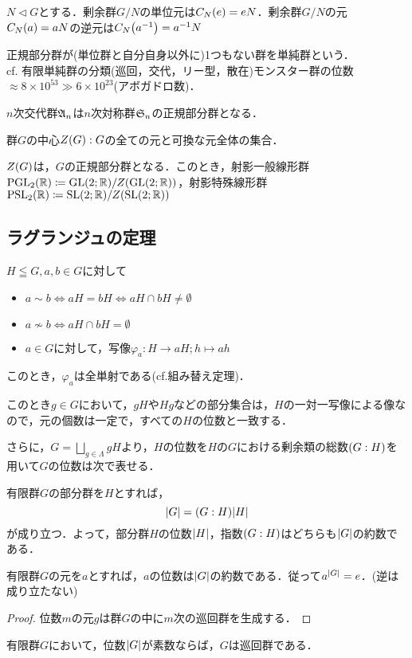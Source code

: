 \documentclass[main]{subfiles}
\begin{document}
	\begin{remark*}
		$N\triangleleft G$とする．剰余群$G/N$の単位元は$C_N\qty(e)=eN$．剰余群$G/N$の元$C_N\qty(a)=aN$の逆元は$C_N\qty(a^{-1})=a^{-1}N$
	\end{remark*}
	\begin{dfn}[単純群]
		正規部分群が(単位群と自分自身以外に)1つもない群を単純群という．\\
		cf. 有限単純群の分類(巡回，交代，リー型，散在)モンスター群の位数$\approx 8\times 10^{53}\gg 6\times 10^{23}$(アボガドロ数)．
	\end{dfn}
	\begin{ex}
		$n$次交代群$\mathfrak{A}_n$は$n$次対称群$\mathfrak{S}_n$の正規部分群となる．
	\end{ex}
	\begin{dfn}
		群$G$の中心$Z\qty(G):G$の全ての元と可換な元全体の集合．
	\end{dfn}
	\begin{remark*}
		$Z\qty(G)$は，$G$の正規部分群となる．このとき，射影一般線形群$\text{PGL}_2\qty(\mathbb{R})\coloneqq \text{GL}\qty(2;\mathbb{R})/Z\qty(\text{GL}\qty(2;\mathbb{R}))$，射影特殊線形群$\text{PSL}_2\qty(\mathbb{R})\coloneqq \text{SL}\qty(2;\mathbb{R})/Z\qty(\text{SL}\qty(2;\mathbb{R}))$
	\end{remark*}
	\subsection{ラグランジュの定理}
		\begin{prop}[左剰余類に関する定理]
			$H\leqq G,a,b\in G$に対して
			\begin{itemize}
				\item $a\sim b\Leftrightarrow aH=bH\Leftrightarrow aH\cap bH\neq\emptyset$
				\item $a\not\sim b\Leftrightarrow aH\cap bH=\emptyset$
				\item $a\in G$に対して，写像$\varphi_a:H\to aH;h\mapsto ah$
			\end{itemize}
			このとき，$\varphi_a$は全単射である(cf.組み替え定理)．
		\end{prop}
		このとき$g\in G$において，$gH$や$Hg$などの部分集合は，$H$の一対一写像による像なので，元の個数は一定で，すべての$H$の位数と一致する．

		さらに，$G=\bigsqcup_{g\in\Lambda}gH$より，$H$の位数を$H$の$G$における剰余類の総数$\qty(G:H)$を用いて$G$の位数は次で表せる．
		\begin{thm}[ラグランジュの定理]
			有限群$G$の部分群を$H$とすれば，
			\[\qty|G|=\qty(G:H)\qty|H|\]
			が成り立つ．よって，部分群$H$の位数$\qty|H|$，指数$\qty(G:H)$はどちらも$\qty|G|$の約数である．
		\end{thm}
		\begin{cor}
			有限群$G$の元を$a$とすれば，$a$の位数は$\qty|G|$の約数である．従って$a^\qty|G|=e$．(逆は成り立たない)
		\end{cor}
		\begin{proof}
			位数$m$の元$g$は群$G$の中に$m$次の巡回群を生成する．
		\end{proof}
		\begin{cor}
			有限群$G$において，位数$\qty|G|$が素数ならば，$G$は巡回群である．
		\end{cor}
\end{document}
